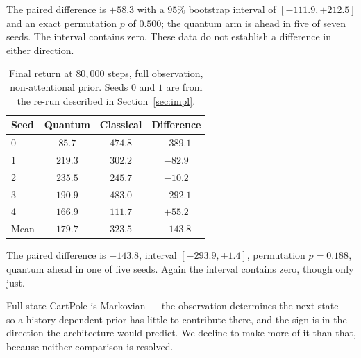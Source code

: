\documentclass[11pt]{article}
\newif\ifdraft
\newcommand{\pendpara}[1]{%
  \ifdraft\par\vspace{2pt}\noindent
  \fcolorbox{PendFG}{PendBG}{%
    \begin{minipage}{0.97\linewidth}\small\textcolor{PendFG}{%
      \textbf{TO DO.} #1}\end{minipage}}\par\vspace{4pt}\fi}
\begin{document}
The paired difference is $+58.3$ with a $95\%$ bootstrap interval of
$[-111.9, +212.5]$ and an exact permutation $p$ of $0.500$; the quantum
arm is ahead in five of seven seeds. The interval contains zero. These
data do not establish a difference in either direction.

\begin{table}[h]\centering\small
\caption{Final return at $80{,}000$ steps, full observation,
non-attentional prior. Seeds $0$ and $1$ are from the re-run described
in Section~\ref{sec:impl}.}
\label{tab:full}
\begin{tabular}{lccc}
\toprule
Seed & Quantum & Classical & Difference \\
\midrule
0 & $85.7$  & $474.8$ & $-389.1$ \\
1 & $219.3$ & $302.2$ & $-82.9$ \\
2 & $235.5$ & $245.7$ & $-10.2$ \\
3 & $190.9$ & $483.0$ & $-292.1$ \\
4 & $166.9$ & $111.7$ & $+55.2$ \\
\midrule
Mean & $179.7$ & $323.5$ & $-143.8$ \\
\bottomrule
\end{tabular}
\end{table}

The paired difference is $-143.8$, interval $[-293.9, +1.4]$,
permutation $p = 0.188$, quantum ahead in one of five seeds. Again the
interval contains zero, though only just.

Full-state CartPole is Markovian --- the observation determines the next
state --- so a history-dependent prior has little to contribute there,
and the sign is in the direction the architecture would predict. We
decline to make more of it than that, because neither comparison is
resolved.

\pendpara{\textbf{Unexplained discrepancy, to resolve before
submission.} Full-observation seed $0$ returned $310.8$ in the original
run and $85.7$ in the re-run, at nominally identical configuration and
seed --- a factor of $3.6$. Seed $1$ moved from $247.7$ to $219.3$, a
factor of $1.1$. One plausible cause is that the two runs differed in
CPU thread count, which changes floating-point reduction order and so
the trajectory of an otherwise deterministic optimisation; the re-runs
were launched with \texttt{OMP\_NUM\_THREADS=1} and the originals may
not have been. This must be checked and either explained or reported: if
seed control does not survive a threading change, that is a
reproducibility fact about this pipeline which belongs in the paper,
and it bears on the companion paper's argument~\cite{papera}.}
\end{document}
